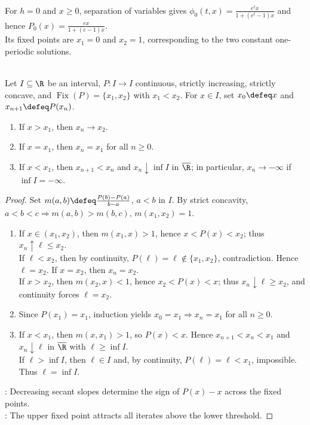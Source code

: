 \begin{example} \label{ex:unharvested-logistic-poincare-map} \\
For $h=0$ and $x\geq0$, separation of variables gives $\phi_0(t,x)=\frac{e^t x}{1+(e^t-1)x}$ and hence $P_0(x)=\frac{ex}{1+(e-1)x}$.\\
Its fixed points are $x_1=0$ and $x_2=1$, corresponding to the two constant one-periodic solutions.
\end{example}

\begin{theorem} \label{thm:increasing-concave-map-iteration} \\
Let $I\subseteq\R$ be an interval, $P:I\to I$ continuous, strictly increasing, strictly concave, and $\operatorname{Fix}(P)=\{x_1,x_2\}$ with $x_1<x_2$. For $x\in I$, set $x_0\defeq x$ and $x_{n+1}\defeq P(x_n)$.
\begin{enumerate}[label=(\roman*)]
\setlength{\itemsep}{0pt}
\item If $x>x_1$, then $x_n\to x_2$.
\item If $x=x_1$, then $x_n=x_1$ for all $n\geq0$.
\item If $x<x_1$, then $x_{n+1}<x_n$ and $x_n\downarrow\inf I$ in $\overline{\R}$; in particular, $x_n\to-\infty$ if $\inf I=-\infty$.
\end{enumerate}
\begin{proof}
Set $m(a,b)\defeq\frac{P(b)-P(a)}{b-a}$, $a<b$ in $I$. By strict concavity, $a<b<c\Rightarrow m(a,b)>m(b,c)$, $m(x_1,x_2)=1$.
\begin{enumerate}[label=(\roman*)]
\setlength{\itemsep}{0pt}
\item If $x\in(x_1,x_2)$, then $m(x_1,x)>1$, hence $x<P(x)<x_2$; thus $x_n\uparrow\ell\leq x_2$.\\
If $\ell<x_2$, then by continuity, $P(\ell)=\ell\notin\{x_1,x_2\}$, contradiction. Hence $\ell=x_2$. If $x=x_2$, then $x_n=x_2$.\\
If $x>x_2$, then $m(x_2,x)<1$, hence $x_2<P(x)<x$; thus $x_n\downarrow\ell\geq x_2$, and continuity forces $\ell=x_2$.
\item Since $P(x_1)=x_1$, induction yields $x_0=x_1\Rightarrow x_n=x_1$ for all $n\geq0$.
\item If $x<x_1$, then $m(x,x_1)>1$, so $P(x)<x$. Hence $x_{n+1}<x_n<x_1$ and $x_n\downarrow\ell$ in $\overline{\R}$ with $\ell\geq\inf I$.\\
If $\ell>\inf I$, then $\ell\in I$ and, by continuity, $P(\ell)=\ell<x_1$, impossible. Thus $\ell=\inf I$.
\end{enumerate}
: Decreasing secant slopes determine the sign of $P(x)-x$ across the fixed points.\\
: The upper fixed point attracts all iterates above the lower threshold.
\end{proof}
\end{theorem}


